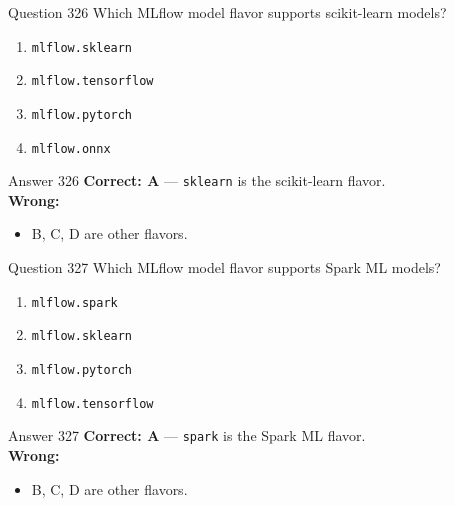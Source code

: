 \documentclass[aspectratio=169,11pt]{beamer}
\begin{document}
	\begin{frame}{Question 326}
		Which MLflow model flavor supports scikit-learn models?
		\begin{enumerate}[label=\Alph*.]
			\item \texttt{mlflow.sklearn}
			\item \texttt{mlflow.tensorflow}
			\item \texttt{mlflow.pytorch}
			\item \texttt{mlflow.onnx}
		\end{enumerate}
	\end{frame}
	\begin{frame}{Answer 326}
		\textbf{Correct: A} --- \texttt{sklearn} is the scikit-learn flavor.\\
		\vspace{0.5em}
		\textbf{Wrong:}
		\begin{itemize}
			\item B, C, D are other flavors.
		\end{itemize}
	\end{frame}
	
	\begin{frame}{Question 327}
		Which MLflow model flavor supports Spark ML models?
		\begin{enumerate}[label=\Alph*.]
			\item \texttt{mlflow.spark}
			\item \texttt{mlflow.sklearn}
			\item \texttt{mlflow.pytorch}
			\item \texttt{mlflow.tensorflow}
		\end{enumerate}
	\end{frame}
	\begin{frame}{Answer 327}
		\textbf{Correct: A} --- \texttt{spark} is the Spark ML flavor.\\
		\vspace{0.5em}
		\textbf{Wrong:}
		\begin{itemize}
			\item B, C, D are other flavors.
		\end{itemize}
	\end{frame}
	
\end{document}
